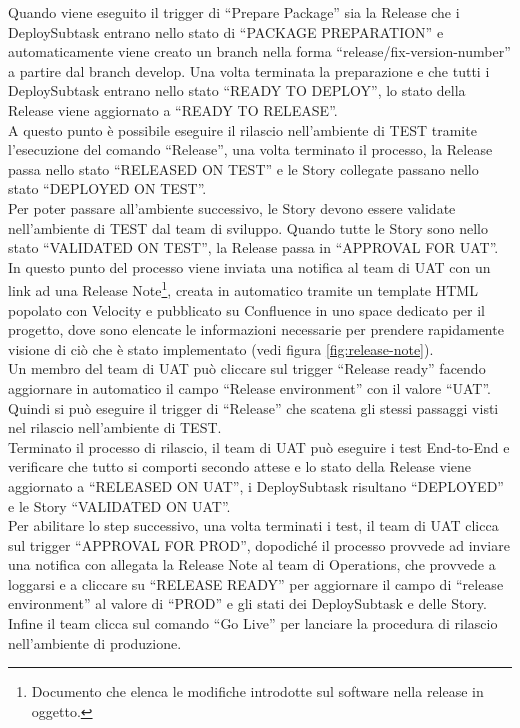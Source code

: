 \documentclass[a4paper, 12pt]{report}
\numberwithin{equation}{section}
\begin{document}
Quando viene eseguito il trigger di “Prepare Package” sia la Release che i DeploySubtask entrano nello stato di “PACKAGE PREPARATION” e automaticamente viene creato un branch nella forma “release/fix-version-number” a partire dal branch develop. Una volta terminata la preparazione e che tutti i DeploySubtask entrano nello stato “READY TO DEPLOY”, lo stato della Release viene aggiornato a “READY TO RELEASE”.\\
A questo punto è possibile eseguire il rilascio nell’ambiente di TEST tramite l’esecuzione del comando “Release”, una volta terminato il processo, la Release passa nello stato “RELEASED ON TEST” e le Story collegate passano nello stato “DEPLOYED ON TEST”.\\
Per poter passare all’ambiente successivo, le Story devono essere validate nell’ambiente di TEST dal team di sviluppo. Quando tutte le Story sono nello stato “VALIDATED ON TEST”, la Release passa in “APPROVAL FOR UAT”.\\
In questo punto del processo viene inviata una notifica al team di UAT con un link ad una Release Note\footnote{Documento che elenca le modifiche introdotte sul software nella release in oggetto.}, creata in automatico tramite un template HTML popolato con Velocity e pubblicato su Confluence in uno space dedicato per il progetto, dove sono elencate le informazioni necessarie per prendere rapidamente visione di ciò che è stato implementato (vedi figura \ref{fig:release-note}).\\
Un membro del team di UAT può cliccare sul trigger “Release ready” facendo aggiornare in automatico il campo “Release environment” con il valore “UAT”. Quindi si può eseguire il trigger di “Release” che scatena gli stessi passaggi visti nel rilascio nell’ambiente di TEST.\\
Terminato il processo di rilascio, il team di UAT può eseguire i test End-to-End e verificare che tutto si comporti secondo attese e lo stato della Release viene aggiornato a “RELEASED ON UAT”, i DeploySubtask risultano “DEPLOYED” e le Story “VALIDATED ON UAT”.\\
Per abilitare lo step successivo, una volta terminati i test, il team di UAT clicca sul trigger “APPROVAL FOR PROD”, dopodiché il processo provvede ad inviare una notifica con allegata la Release Note al team di Operations, che provvede a loggarsi e a cliccare su “RELEASE READY” per aggiornare il campo di “release environment” al valore di “PROD” e gli stati dei DeploySubtask e delle Story. Infine il team clicca sul comando “Go Live” per lanciare la procedura di rilascio nell’ambiente di produzione.\\
\end{document}
